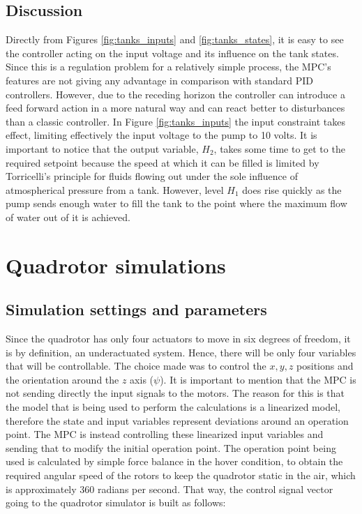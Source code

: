 \subsection{Discussion}

Directly from Figures \ref{fig:tanks_inputs} and \ref{fig:tanks_states}, it is easy to see the controller acting on the input voltage and its influence on the tank states. Since this is a regulation problem for a relatively simple process, the MPC's features are not giving any advantage in comparison with standard PID controllers. However, due to the receding horizon the controller can introduce a feed forward action in a more natural way and can react better to disturbances than a classic controller. In Figure \ref{fig:tanks_inputs} the input constraint takes effect, limiting effectively the input voltage to the pump to 10 volts. It is important to notice that the output variable, $H_2$, takes some time to get to the required setpoint because the speed at which it can be filled is limited by Torricelli's principle for fluids flowing out under the sole influence of atmospherical pressure from a tank. However, level $H_1$ does rise quickly as the pump sends enough water to fill the tank to the point where the maximum flow of water out of it is achieved. 


\section{Quadrotor simulations}

\subsection{Simulation settings and parameters}

Since the quadrotor has only four actuators to move in six degrees of freedom, it is by definition, an underactuated system. Hence, there will be only four variables that will be controllable. The choice made was to control the $x, y, z$ positions and the orientation around the $z$ axis ($\psi$). It is important to mention that the MPC is not sending directly the input signals to the motors. The reason for this is that the model that is being used to perform the calculations is a linearized model, therefore the state and input variables represent deviations around an operation point. The MPC is instead controlling these linearized input variables and sending that to modify the initial operation point. The operation point being used is calculated by simple force balance in the hover condition, to obtain the required angular speed of the rotors to keep the quadrotor static in the air, which is approximately $360$ radians per second. That way, the control signal vector going to the quadrotor simulator is built as follows:

